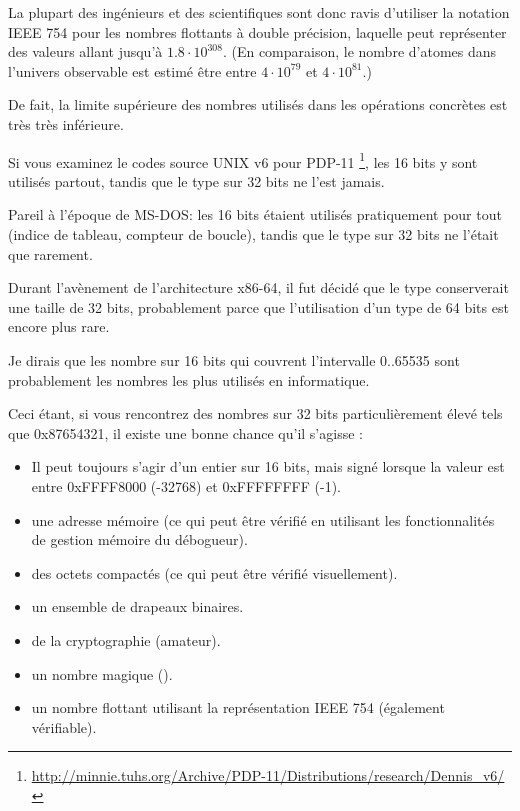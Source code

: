 La plupart des ingénieurs et des scientifiques sont donc ravis d'utiliser la notation IEEE 754 pour les
nombres flottants à double précision, laquelle peut représenter des valeurs allant jusqu'à $1.8 \cdot 10^{308}$.
(En comparaison, le nombre d'atomes dans l'univers observable est estimé être entre $4 \cdot 10^{79}$ et $4 \cdot 10^{81}$.)

De fait, la limite supérieure des nombres utilisés dans les opérations concrètes est très très inférieure.

Si vous examinez le codes source UNIX v6 pour PDP-11
\footnote{\url{http://minnie.tuhs.org/Archive/PDP-11/Distributions/research/Dennis_v6/}},
les  16 bits y sont utilisés partout, tandis que le type  sur 32 bits ne l'est jamais.

Pareil à l'époque de MS-DOS: les  16 bits étaient utilisés pratiquement pour tout (indice de tableau, compteur de boucle),
tandis que le type  sur 32 bits ne l'était que rarement.

Durant l'avènement de l'architecture x86-64, il fut décidé que le type  conserverait une taille de 32 bits,
probablement parce que l'utilisation d'un type  de 64 bits est encore plus rare.

Je dirais que les nombre sur 16 bits qui couvrent l'intervalle 0..65535 sont probablement les nombres les plus
utilisés en informatique.

Ceci étant, si vous rencontrez des nombres sur 32 bits particulièrement élevé tels que 0x87654321, il existe une
bonne chance qu'il s'agisse :

\begin{itemize}

\item Il peut toujours s'agir d'un entier sur 16 bits, mais signé lorsque la valeur est entre 0xFFFF8000 (-32768) et 0xFFFFFFFF (-1).
\item une adresse mémoire (ce qui peut être vérifié en utilisant les fonctionnalités de gestion mémoire du débogueur).
\item des octets compactés (ce qui peut être vérifié visuellement).
\item un ensemble de drapeaux binaires.
\item de la cryptographie (amateur).
\item un nombre magique ().
\item un nombre flottant utilisant la représentation IEEE 754 (également vérifiable).

\end{itemize}

